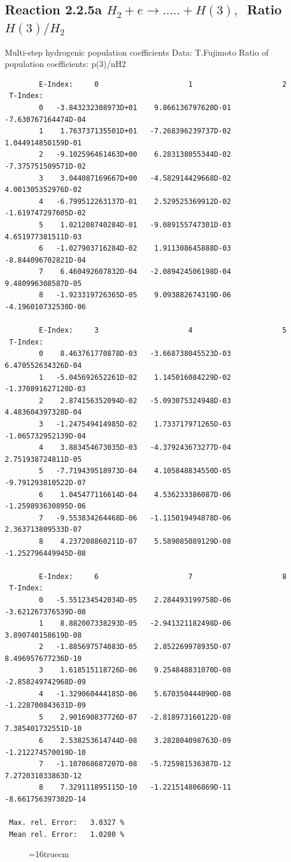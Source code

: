 \documentclass[12pt,dvips]{article}
\begin{document}
\subsection{
Reaction 2.2.5a $ H_2 + e \rightarrow .....+ H(3), \   $
Ratio $H(3)/H_2 $
}
 Multi-step hydrogenic population coefficients
 Data: T.Fujimoto
 Ratio of population coefficients: p(3)/nH2


\begin{small}\begin{verbatim}
        E-Index:     0                     1                     2
 T-Index:
        0   -3.843232308973D+01    9.866136797620D-01   -7.630767164474D-04
        1    1.763737135501D+01   -7.268396239737D-02    1.044914850159D-01
        2   -9.102596461463D+00    6.283138055344D-02   -7.375751509571D-02
        3    3.044087169667D+00   -4.582914429668D-02    4.001305352976D-02
        4   -6.799512263137D-01    2.529525369912D-02   -1.619747297605D-02
        5    1.021208740284D-01   -9.089155747301D-03    4.651977381511D-03
        6   -1.027903716284D-02    1.911308645888D-03   -8.844096702821D-04
        7    6.460492607832D-04   -2.089424506198D-04    9.480996308587D-05
        8   -1.923319726365D-05    9.093882674319D-06   -4.196010732530D-06

        E-Index:     3                     4                     5
 T-Index:
        0    8.463761770878D-03   -3.668738045523D-03    6.470552634326D-04
        1   -5.045692652261D-02    1.145016084229D-02   -1.370891627120D-03
        2    2.874156352094D-02   -5.093075324948D-03    4.483604397328D-04
        3   -1.247549414985D-02    1.733717971265D-03   -1.065732952139D-04
        4    3.883454673035D-03   -4.379243673277D-04    2.751938724811D-05
        5   -7.719439518973D-04    4.105848834550D-05   -9.791293810522D-07
        6    1.045477116614D-04    4.536233386087D-06   -1.259893630895D-06
        7   -9.553834264468D-06   -1.115019494878D-06    2.363713809533D-07
        8    4.237208860211D-07    5.589085089129D-08   -1.252796449945D-08

        E-Index:     6                     7                     8
 T-Index:
        0   -5.551234542034D-05    2.284493199758D-06   -3.621267376539D-08
        1    8.882007338293D-05   -2.941321182498D-06    3.890740158619D-08
        2   -1.885697574083D-05    2.852269978935D-07    8.496957677236D-10
        3    1.618515118726D-06    9.254848831070D-08   -2.858249742968D-09
        4   -1.329060444185D-06    5.670350444090D-08   -1.228700843631D-09
        5    2.901690837726D-07   -2.818973160122D-08    7.385401732551D-10
        6    2.538253614744D-08    3.282804098763D-09   -1.212274570019D-10
        7   -1.107068687207D-08   -5.725981536387D-12    7.272031033863D-12
        8    7.329111895115D-10   -1.221514806869D-11   -8.661756397302D-14

 Max. rel. Error:   3.0327 %
 Mean rel. Error:   1.0280 %

\end{verbatim}\end{small}
\begin{figure} \label{2.2.5a}
\epsfxsize=16truecm
\end{figure}
\newpage
\end{document}
